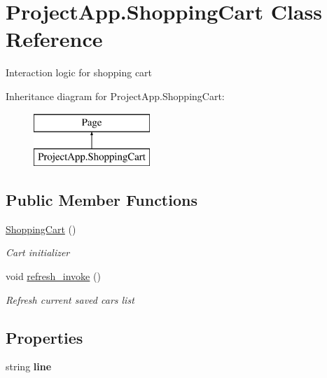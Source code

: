 \hypertarget{class_project_app_1_1_shopping_cart}{}\section{Project\+App.\+Shopping\+Cart Class Reference}
\label{class_project_app_1_1_shopping_cart}


Interaction logic for shopping cart  


Inheritance diagram for Project\+App.\+Shopping\+Cart\+:\begin{figure}[H]
\begin{center}
\leavevmode
\includegraphics[height=2.000000cm]{class_project_app_1_1_shopping_cart}
\end{center}
\end{figure}
\subsection*{Public Member Functions}
\begin{DoxyCompactItemize}
\item 
\mbox{\hyperlink{class_project_app_1_1_shopping_cart_aa1f85785a6afbd74611e27aec40dab81}{Shopping\+Cart}} ()
\begin{DoxyCompactList}\small\item\em Cart initializer \end{DoxyCompactList}\item 
void \mbox{\hyperlink{class_project_app_1_1_shopping_cart_a6041aa28dc90fba4aa37f503fb98a948}{refresh\+\_\+invoke}} ()
\begin{DoxyCompactList}\small\item\em Refresh current saved cars list \end{DoxyCompactList}\end{DoxyCompactItemize}
\subsection*{Properties}
\begin{DoxyCompactItemize}
\item 
\mbox{\label{class_project_app_1_1_shopping_cart_a3e9c70f7db802d622285cde511a2aede}} 
string {\bfseries line}
\end{DoxyCompactItemize}
